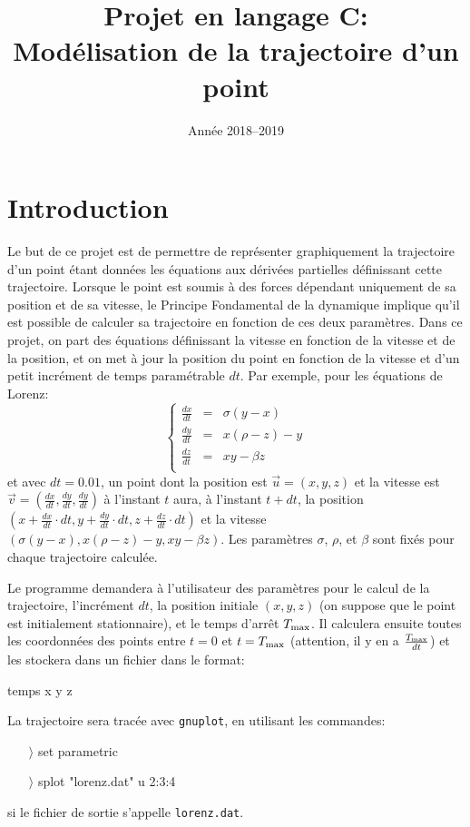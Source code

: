 \documentclass[a4paper]{article}
\title{Projet en langage C:\\
Mod{\'e}lisation de la trajectoire d'un point}
\author{\titre}
\date{Ann{\'e}e 2018--2019}
\renewcommand{\max}{\text{\rm max}}
\newcommand{\vit}[1]{\ensuremath{\frac{d #1}{dt}}}
\begin{document}
\maketitle

\section{Introduction}

Le but de ce projet est de permettre de repr{\'e}senter graphiquement la
trajectoire d'un point {\'e}tant donn{\'e}es les {\'e}quations aux d{\'e}riv{\'e}es
partielles d{\'e}finissant cette trajectoire. Lorsque le point est soumis
{\`a} des forces d{\'e}pendant uniquement de sa position et de sa vitesse, le
Principe Fondamental de la dynamique implique qu'il est possible de
calculer sa trajectoire en fonction de ces deux param{\`e}tres. Dans ce
projet, on part des {\'e}quations d{\'e}finissant la vitesse en fonction de la
vitesse et de la position, et on met {\`a} jour la position du point en
fonction de la vitesse et d'un petit incr{\'e}ment de temps param{\'e}trable
$dt$. Par exemple, pour les {\'e}quations de Lorenz:
$$
\left\lbrace
  \begin{array}{rcl}
    \vit x &=& \sigma ( y - x )\\
    \vit y &=& x ( \rho - z ) - y \\
    \vit z &=& xy - \beta z\\
  \end{array}
\right.
$$
et avec $dt=0.01$, un point dont la position est $\vec u=(x,y,z)$ et
la vitesse est $\vec v=(\vit x,\vit y,\vit y)$ {\`a} l'instant $t$ aura, {\`a}
l'instant $t+dt$, la position $(x+\vit x\cdot dt,y+\vit y \cdot dt,
z+\vit z \cdot dt)$ et la vitesse $(\sigma ( y - x ), x ( \rho - z ) -
y, xy - \beta z)$. Les param{\`e}tres $\sigma$, $\rho$, et $\beta$ sont
fix{\'e}s pour chaque trajectoire calcul{\'e}e.

Le programme demandera {\`a} l'utilisateur des param{\`e}tres pour le calcul
de la trajectoire, l'incr{\'e}ment $dt$, la position initiale $(x,y,z)$
(on suppose que le point est initialement stationnaire), et le temps
d'arr{\^e}t $T_{\max}$. Il calculera ensuite toutes les coordonn{\'e}es des
points entre $t=0$ et $t=T_\max$ (attention, il y en a
$\frac{T_\max}{dt}$) et les stockera dans un fichier dans le format:
\begin{center}
  temps  x y z
\end{center}
La trajectoire sera trac{\'e}e avec \texttt{gnuplot}, en utilisant les
commandes:
{\tt\begin{itemize}
\item[$\rangle$] set parametric
\item[$\rangle$] splot "lorenz.dat" u 2:3:4
\end{itemize}}\noindent
si le fichier de sortie s'appelle \texttt{lorenz.dat}.
\end{document}
